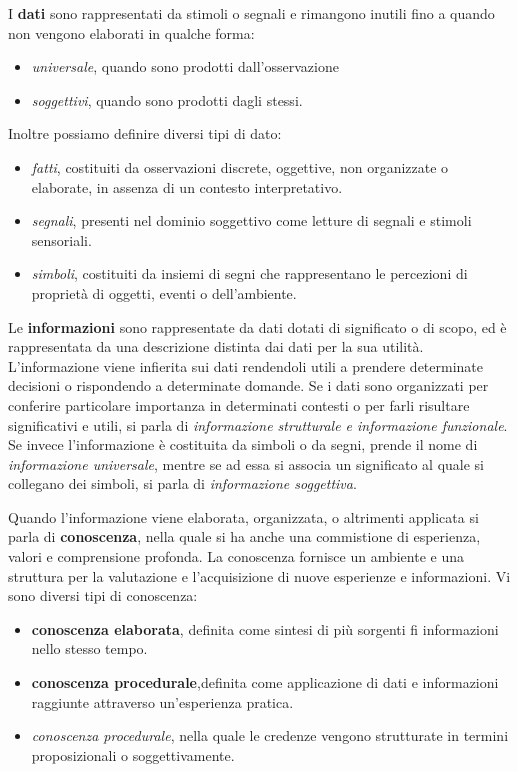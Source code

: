 \documentclass[a4paper]{extarticle}
\begin{document}
I \textbf{dati} sono rappresentati da stimoli o segnali e rimangono inutili fino a quando non vengono elaborati in qualche forma:
\begin{itemize}
\item \textit{universale}, quando sono prodotti dall'osservazione
\item \textit{soggettivi}, quando sono prodotti dagli stessi.
\end{itemize}
Inoltre possiamo definire diversi tipi di dato:
\begin{itemize}
\item \textit{fatti}, costituiti da osservazioni discrete, oggettive, non organizzate o elaborate, in assenza di un contesto interpretativo.
\item \textit{segnali}, presenti nel dominio soggettivo come letture di segnali e stimoli sensoriali.
\item \textit{simboli}, costituiti da insiemi di segni che rappresentano le percezioni di proprietà di oggetti, eventi o dell'ambiente.
\end{itemize}

Le \textbf{informazioni} sono rappresentate da dati dotati di significato o di scopo, ed è rappresentata da una descrizione distinta dai dati per la sua utilità. L'informazione viene infierita sui dati rendendoli utili a prendere determinate decisioni o rispondendo a determinate domande. Se i dati sono organizzati per conferire particolare importanza in determinati contesti o per farli risultare significativi e utili, si parla di \textit{informazione strutturale e informazione funzionale}. Se invece l'informazione è costituita da simboli o da segni, prende il nome di \textit{informazione universale}, mentre se ad essa si associa un significato al quale si collegano dei simboli, si parla di \textit{informazione soggettiva}.

Quando l'informazione viene elaborata, organizzata, o altrimenti applicata si parla di \textbf{conoscenza}, nella quale si ha anche una commistione di esperienza, valori e comprensione profonda. La conoscenza fornisce un ambiente e una struttura per la valutazione  e l'acquisizione di nuove esperienze e informazioni. Vi sono diversi tipi di conoscenza:
\begin{itemize}
\item \textbf{conoscenza elaborata}, definita come sintesi di più sorgenti fi informazioni nello stesso tempo.
\item \textbf{conoscenza procedurale},definita come applicazione di dati e informazioni raggiunte attraverso un'esperienza pratica.
\item \textit{conoscenza procedurale}, nella quale le credenze vengono strutturate in termini proposizionali o soggettivamente. 
\end{itemize}
\end{document}
